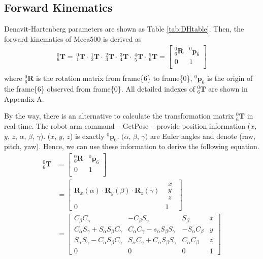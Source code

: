 \subsection*{Forward Kinematics}
\label{sec:forward}
\hspace*{6mm}Denavit-Hartenberg parameters are shown as Table \ref{tab:DHtable}. Then, the forward kinematics of Meca500 is derived as
\begin{equation}
\label{eq:translation matrix}
\begin{split}
^0_6\mathbf{T} =
\ ^0_1\mathbf{T} \cdot \ ^1_2\mathbf{T} \cdot \ ^2_3\mathbf{T} \cdot \ ^3_4\mathbf{T} \cdot \ ^4_5\mathbf{T} \cdot \ ^5_6\mathbf{T} =
\begin{bmatrix}
^0_6\mathbf{R}	&^0\boldsymbol{p}_\mathrm{6}\\
0				&1\\
\end{bmatrix}\\
\end{split}
\end{equation}
where $^0_6\mathbf{R}$ is the rotation matrix from frame\{6\} to frame\{0\}, $^0\boldsymbol{p}_\mathrm{6}$ is the origin of the frame\{6\} observed from frame\{0\}. All detailed indexes of $^0_6\mathbf{T}$ are shown in Appendix A.
\par
By the way, there is an alternative to calculate the transformation matrix $^0_6\mathbf{T} $ in real-time. The robot arm command -- GetPose -- provide position information ($x$, $y$, $z$, $\alpha$, $\beta$, $\gamma$). ($x$, $y$, $z$) is exactly $^0\boldsymbol{p}_\mathrm{6}$. $(\alpha$, $\beta$, $\gamma)$ are Euler angles and denote (raw, pitch, yaw).  Hence, we can use these information to derive the following equation.
\begin{equation}
\begin{split}
^0_6\mathbf{T} 
&=
\begin{bmatrix}
^0_6\mathbf{R}	&^0\boldsymbol{p}_\mathrm{6}\\
0				&1\\
\end{bmatrix}\\
&= 
\begin{bmatrix}
\mathbf{R}_x(\alpha ) \cdot \mathbf{R}_y(\beta ) \cdot \mathbf{R}_z(\gamma ) 
& \begin{matrix}
x\\ 
y\\ 
z
\end{matrix}\\ 
0 & 1
\end{bmatrix}\\
&= 
\begin{bmatrix} 
C_\beta C_\gamma 										& -C_\beta S_\gamma 									& S_\beta 					&x\\ 
C_\alpha S_\gamma +  S_\alpha S_\beta C_\gamma 			& C_\alpha C_\gamma -  s_\alpha S_\beta S_\gamma		& -S_\alpha C_\beta			&y\\ 
S_\alpha S_\gamma -  C_\alpha S_\beta C_\gamma 			& S_\alpha C_\gamma +  C_\alpha S_\beta S_\gamma 		& C_\alpha C_\beta 			&z\\ 
0 														&0 														&0							&1
\end{bmatrix}
\end{split}
\end{equation}
